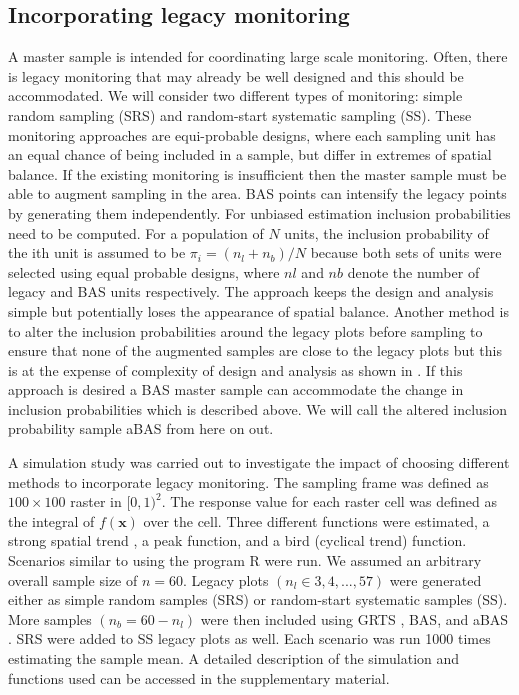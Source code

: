 \documentclass[titlepage]{article}
\begin{document}
\subsection{Incorporating legacy monitoring}
A master sample is intended for coordinating large scale monitoring. Often, there is legacy monitoring that may already be well designed and this should be accommodated. We will consider two different types of monitoring: simple random sampling (SRS) and random-start systematic sampling (SS). These monitoring approaches are equi-probable designs, where each sampling unit has an equal chance of being included in a sample, but differ in extremes of spatial balance. If the existing monitoring is insufficient then the master sample must be able to augment sampling in the area. BAS points can intensify the legacy points by generating them independently. For unbiased estimation inclusion probabilities need to be computed. For a population of $N$ units, the inclusion probability of the ith unit is assumed to be $\pi_i = (n_l+n_b)/N$ because both sets of units were selected using equal probable designs, where $nl$ and $nb$ denote the number of legacy and BAS units respectively. The approach keeps the design and analysis simple but potentially loses the appearance of spatial balance. Another method is to alter the inclusion probabilities around the legacy plots before sampling to ensure that none of the augmented samples are close to the legacy plots but this is at the expense of complexity of design and analysis as shown in \citep{Foster2017}. If this approach is desired a BAS master sample can accommodate the change in inclusion probabilities which is described above. We will call the altered inclusion probability sample aBAS from here on out.

A simulation study was carried out to investigate the impact of choosing different methods to incorporate legacy monitoring. The sampling frame was defined as $100\times100$ raster in $[0,1)^2$. The response value for each raster cell was defined as the integral of $f(\boldsymbol{x})$ over the cell. Three different functions were estimated, a strong spatial trend \citep{Robertson2013, Grafstrom2012}, a peak function, and a bird (cyclical trend) function. Scenarios similar to \citealt{Foster2017} using the program R \citep{R} were run. We assumed an arbitrary overall sample size of $n = 60$. Legacy plots $(n_l \in 3,4,...,57)$ were generated either as simple random samples (SRS) or random-start systematic samples (SS). More samples $(n_b = 60 - n_l)$ were then included using GRTS \citep{spsurvey}, BAS, and aBAS \citep{MBHdesign}. SRS were added to SS legacy plots as well.  Each scenario was run 1000 times estimating the sample mean. A detailed description of the simulation and functions used can be accessed in the supplementary material.
\end{document}
